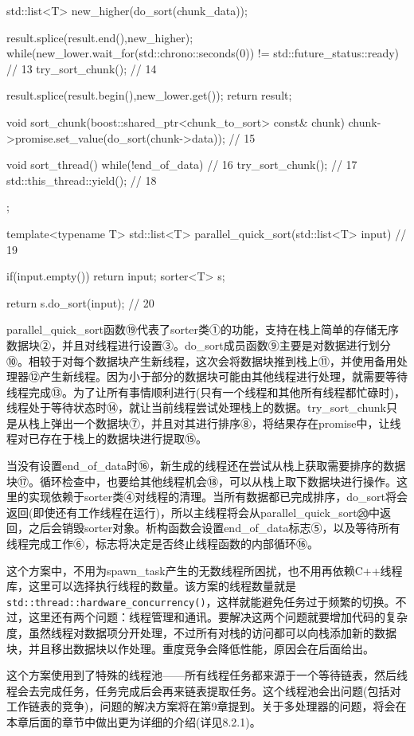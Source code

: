 \begin{cpp}
{{    std::list<T> new_higher(do_sort(chunk_data));

    result.splice(result.end(),new_higher);
    while(new_lower.wait_for(std::chrono::seconds(0)) !=
       std::future_status::ready)  // 13
    {
      try_sort_chunk();  // 14
    }

    result.splice(result.begin(),new_lower.get());
    return result;
  }

  void sort_chunk(boost::shared_ptr<chunk_to_sort> const& chunk)
  {
    chunk->promise.set_value(do_sort(chunk->data));  // 15
  }

  void sort_thread()
  {
    while(!end_of_data)  // 16
    {
      try_sort_chunk();  // 17
      std::this_thread::yield();  // 18
    }
  }
};

template<typename T>
std::list<T> parallel_quick_sort(std::list<T> input)  // 19
{
  if(input.empty())
  {
    return input;
  }
  sorter<T> s;

  return s.do_sort(input);  // 20
}
\end{cpp}

parallel\_quick\_sort函数⑲代表了sorter类①的功能，支持在栈上简单的存储无序数据块②，并且对线程进行设置③。do\_sort成员函数⑨主要是对数据进行划分⑩。相较于对每个数据块产生新线程，这次会将数据块推到栈上⑪，并使用备用处理器⑫产生新线程。因为小于部分的数据块可能由其他线程进行处理，就需要等待线程完成⑬。为了让所有事情顺利进行(只有一个线程和其他所有线程都忙碌时)，线程处于等待状态时⑭，就让当前线程尝试处理栈上的数据。try\_sort\_chunk只是从栈上弹出一个数据块⑦，并且对其进行排序⑧，将结果存在promise中，让线程对已存在于栈上的数据块进行提取⑮。

当没有设置end\_of\_data时⑯，新生成的线程还在尝试从栈上获取需要排序的数据块⑰。循环检查中，也要给其他线程机会⑱，可以从栈上取下数据块进行操作。这里的实现依赖于sorter类④对线程的清理。当所有数据都已完成排序，do\_sort将会返回(即使还有工作线程在运行)，所以主线程将会从parallel\_quick\_sort⑳中返回，之后会销毁sorter对象。析构函数会设置end\_of\_data标志⑤，以及等待所有线程完成工作⑥，标志将决定是否终止线程函数的内部循环⑯。

这个方案中，不用为spawn\_task产生的无数线程所困扰，也不用再依赖C++线程库，这里可以选择执行线程的数量。该方案的线程数量就是\texttt{std::thread::hardware\_concurrency()}，这样就能避免任务过于频繁的切换。不过，这里还有两个问题：线程管理和通讯。要解决这两个问题就要增加代码的复杂度，虽然线程对数据项分开处理，不过所有对栈的访问都可以向栈添加新的数据块，并且移出数据块以作处理。重度竞争会降低性能，原因会在后面给出。

这个方案使用到了特殊的线程池——所有线程任务都来源于一个等待链表，然后线程会去完成任务，任务完成后会再来链表提取任务。这个线程池会出问题(包括对工作链表的竞争)，问题的解决方案将在第9章提到。关于多处理器的问题，将会在本章后面的章节中做出更为详细的介绍(详见8.2.1)。


